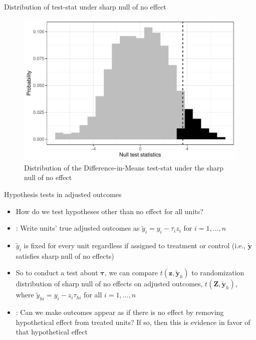 \documentclass[table, xcolor = {dvipsnames}, 9pt]{beamer}
\theoremstyle{plain}
\newcommand{\mh}[1]{{\color{magenta}{#1}}}
\begin{document}
\begin{frame}{Distribution of test-stat under sharp null of no effect}
\begin{figure}[H]
\includegraphics[width=0.9\linewidth]{null_dist_no_effect_plot.pdf}
\caption{Distribution of the Difference-in-Means test-stat under the sharp null of no effect}
\end{figure}
\end{frame}
\begin{frame}{Hypothesis tests in adjusted outcomes}
\vfill
\begin{itemize} 
\item How do we test hypotheses other than no effect for all units? \vfill
\item \citet{rosenbaum2002,rosenbaum2010,rosenbaum2017}: Write units' true adjusted outcomes as $\tilde{y}_i = y_i - \tau_i z_i$ for $i = 1, \ldots , n$ \vfill
\item $\tilde{y}_i$ is fixed for every unit regardless if assigned to treatment or control (i.e., $\bm{\tilde{y}}$ satisfies sharp null of no effects) \vfill
\item So to conduct a test about $\bm{\tau}$, we can compare $t(\bm{z}, \bm{\tilde{y}}_{h})$ to randomization distribution of sharp null of no effects on adjusted outcomes, $t(\bm{Z}, \bm{\tilde{y}}_{h})$, where $\tilde{y}_{hi} = y_i - z_i \tau_{hi}$ for all $i = 1, \ldots , n$ \vfill
\item \mh{Intuition}: Can we make outcomes appear as if there is no effect by removing hypothetical effect from treated units? If so, then this is evidence in favor of that hypothetical effect
\end{itemize}
\vfill
\end{frame}
\end{document}
